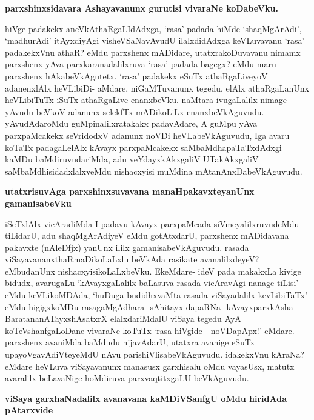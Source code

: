 {\bf parxshinxsidavara Ashayavanunx gurutisi vivaraNe koDabeVku.}

hiVge padakekx aneVkAthaRgaLIdAdxga, `rasa' padada hiMde `shaqMgArAdi', `madhurAdi' itAyxdiyAgi visheVSaNavAvudU ilalxdidAdxga keVLuvavanu `rasa' padakekxVnu athaR? eMdu parxshenx mADidare, utatxrakoDuvavanu nimamx parxshenx yAva parxkaranadalilxruva `rasa' padada bagegx? eMdu maru parxshenx hAkabeVkAgutetx. `rasa' padakekx eSuTx athaRgaLiveyoV adanenxlAlx heVLibiDi- aMdare, niGaMTuvanunx tegedu, elAlx athaRgaLanUnx heVLibiTuTx iSuTx athaRgaLive enanxbeVku. naMtara ivugaLalilx nimage yAvudu beVkoV adanunx selekfTx mADikoLiLx enanxbeVkAguvudu. yAvudAdaroMdu guMpinalilxratakakx padavAdare, A guMpu yAva parxpaMcakekx seVridodxV adanunx noVDi heVLabeVkAguvudu, Iga avaru koTaTx padagaLelAlx kAvayx parxpaMcakekx saMbaMdhapaTaTxdAdxgi kaMDu baMdiruvudariMda, adu veYdayxkAkxgaliV UTakAkxgaliV saMbaMdhisidadxlalxveMdu nishacxyisi muMdina mAtanAnxDabeVkAguvudu.

{\bf utatxrisuvAga parxshinxsuvavana manaHpakavxteyanUnx gamanisabeVku}

iSeTxlAlx vicAradiMda I padavu kAvayx parxpaMcada siVmeyalilxruvudeMdu tiLidarU, adu shaqMgArAdiyeV eMdu gotAtxdarU, parxshenx mADidavana pakavxte (nAleDfjx) yanUnx ililx gamanisabeVkAguvudu. rasada viSayavananxthaRmaDikoLaLxlu beVkAda rasikate avanalilxdeyeV? eMbudanUnx nishacxyisikoLaLxbeVku. EkeMdare- ideV pada makakxLa kivige bidudx, avarugaLu `kAvayxgaLalilx baLasuva rasada vicAravAgi nanage tiLisi' eMdu keVLikoMDAda, `huDuga budidhxvaMta rasada viSayadalilx kevLibiTaTx' eMdu higigxkoMDu rasagaMgAdhara- sAhitayx dapaRNa- kAvayxparxkAsha- BaratananATayxshAsatxrX elalxdariMdalU viSaya tegedu AyA koTeVshanfgaLoDane vivaraNe koTuTx `rasa hiVgide - noVDapApx!' eMdare. parxshenx avaniMda baMdudu nijavAdarU, utatxra avanige eSuTx upayoVgavAdiVteyeMdU nAvu parishiVlisabeVkAguvudu. idakekxVnu kAraNa? eMdare heVLuva viSayavanunx manasusx garxhisalu oMdu vayasUsx, matutx avaralilx beLavaNige hoMdiruva parxvaqtitxgaLU beVkAguvudu.

{\bf viSaya garxhaNadalilx avanavana kaMDiVSanfgU oMdu hiridAda pAtarxvide}

